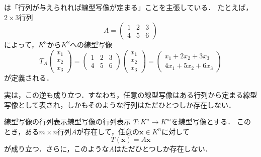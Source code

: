 は「行列が与えられれば線型写像が定まる」ことを主張している．
たとえば，$2 \times 3$行列
\[
  A = \begin{pmatrix} 1 & 2 & 3 \\ 4 & 5 & 6 \end{pmatrix}
\]
によって，$K^3$から$K^2$への線型写像
\[
  T_A\begin{pmatrix} x_1 \\ x_2 \\ x_3 \end{pmatrix} =
  \begin{pmatrix} 1 & 2 & 3 \\ 4 & 5 & 6 \end{pmatrix}
  \begin{pmatrix} x_1 \\ x_2 \\ x_3 \end{pmatrix}
  = \begin{pmatrix} x_1 + 2x_2 + 3x_3 \\ 4x_1 + 5x_2 + 6x_3 \end{pmatrix}
\]
が定義される．

実は，この逆も成り立つ．すなわち，任意の線型写像はある行列から定まる線型写像として表され，しかもそのような行列はただひとつしか存在しない．

\begin{theorem}{線型写像の行列表示}{線型写像の行列表示}
  $T \colon K^n \to K^m$を線型写像とする．
  このとき，ある$m \times n$行列$A$が存在して，任意の$\bm{x} \in K^n$に対して
  \[
    T(\bm{x}) = A\bm{x}
  \]
  が成り立つ．さらに，このような$A$はただひとつしか存在しない．
\end{theorem}

